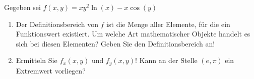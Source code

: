 \item Gegeben sei $f(x,y) = xy^2\ln(x)-x\cos(y)$

\begin{enumerate}
\item Der Definitionsbereich von $f$ ist die Menge aller Elemente, für die ein Funktionswert existiert. Um welche Art mathematischer Objekte handelt es sich bei diesen Elementen? Geben Sie den Definitionsbereich an!

\item Ermitteln Sie $f_x(x,y)$ und $f_y(x,y)$! Kann an der Stelle $(e,\pi)$ ein Extremwert vorliegen?

\end{enumerate}

